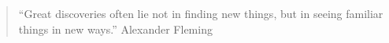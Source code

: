 


\begin{quote}
``Great discoveries often lie not in finding new things, but in seeing familiar things in new ways.'' \hfill Alexander Fleming
\end{quote}







{\LaTeXraggedright
{}
\par}

